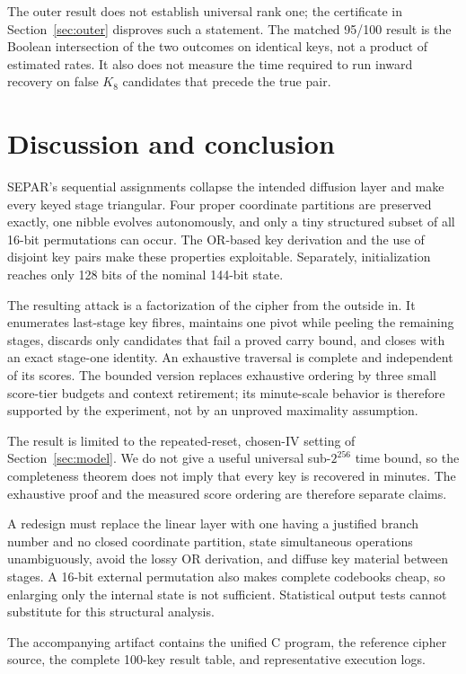 \documentclass[10pt]{article}
\theoremstyle{plain}
\theoremstyle{definition}
\theoremstyle{remark}
\begin{document}
The outer result does not establish universal rank one; the certificate in
Section~\ref{sec:outer} disproves such a statement.  The matched 95/100 result
is the Boolean intersection of the two outcomes on identical keys, not a
product of estimated rates.  It also does not measure the time required to run
inward recovery on false \(K_8\) candidates that precede the true pair.

\section{Discussion and conclusion}

SEPAR's sequential assignments collapse the intended diffusion layer and make
every keyed stage triangular.  Four proper coordinate partitions are
preserved exactly, one nibble evolves autonomously, and only a tiny structured
subset of all 16-bit permutations can occur.  The OR-based key derivation and
the use of disjoint key pairs make these properties exploitable.  Separately,
initialization reaches only 128 bits of the nominal 144-bit state.

The resulting attack is a factorization of the cipher from the outside in.
It enumerates last-stage key fibres, maintains one pivot while peeling the
remaining stages, discards only candidates that fail a proved carry bound, and
closes with an exact stage-one identity.  An exhaustive traversal is complete
and independent of its scores.  The bounded version replaces exhaustive
ordering by three small score-tier budgets and context retirement; its
minute-scale behavior is therefore supported by the experiment, not by an
unproved maximality assumption.

The result is limited to the repeated-reset, chosen-IV setting of
Section~\ref{sec:model}.  We do not give a useful universal sub-\(2^{256}\)
time bound, so the completeness theorem does not imply that every key is
recovered in minutes.  The exhaustive proof and the measured score ordering
are therefore separate claims.

A redesign must replace the linear layer with one having a justified branch
number and no closed coordinate partition, state simultaneous operations
unambiguously, avoid the lossy OR derivation, and diffuse key material between
stages.  A 16-bit external permutation also makes complete codebooks cheap, so
enlarging only the internal state is not sufficient.  Statistical output tests
cannot substitute for this structural analysis.

The accompanying artifact contains the unified C program, the reference cipher
source, the complete 100-key result table, and representative execution logs.
\end{document}

